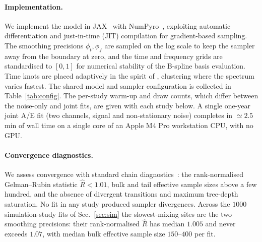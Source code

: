 \documentclass[
  aps,
  prd,
  twocolumn,
  amsmath,
  amssymb,
  nofootinbib,
  superscriptaddress,
  longbibliography,
]{revtex4-2}
\newcommand{\project}[1]{\textsf{#1}}
\begin{document}
\paragraph*{Implementation.}
We implement the model in \project{JAX}~\citep{jax2018github} with
\project{NumPyro}~\citep{phan2019numphyro}, exploiting automatic differentiation
and just-in-time (JIT) compilation for gradient-based sampling. The smoothing
precisions $\phi_t,\phi_f$ are sampled on the log scale to keep the sampler away
from the boundary at zero, and the time and frequency grids are standardised to
$[0,1]$ for numerical stability of the B-spline basis evaluation. Time knots are
placed adaptively in the spirit of \citet{maturana2021bayesian}, clustering where
the spectrum varies fastest. The shared model and sampler configuration is
collected in Table~\ref{tab:config}. The per-study warm-up and draw counts, which
differ between the noise-only and joint fits, are given with each study below. A
single one-year joint A/E fit (two channels, signal and non-stationary noise)
completes in $\simeq 2.5\,$min of wall time on a single core of an Apple M4 Pro
workstation CPU, with no GPU.

\paragraph*{Convergence diagnostics.}
We assess convergence with standard chain
diagnostics~\citep{gelman1992inference,arviz_2019}: the rank-normalised
Gelman--Rubin statistic $\hat R<1.01$, bulk and tail effective sample sizes above
a few hundred, and the absence of divergent transitions and maximum tree-depth
saturation. No fit in any study produced sampler divergences. Across the
$1000$ simulation-study fits of Sec.~\ref{sec:sim} the slowest-mixing sites are
the two smoothing precisions: their rank-normalised $\hat R$ has median
$1.005$ and never exceeds $1.07$, with median bulk effective sample size
$150$--$400$ per fit.
\end{document}
